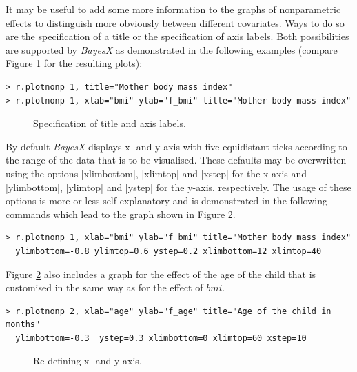 \documentclass[a4paper]{article}
\begin{document}
It may be useful to add some more information to the graphs of
nonparametric effects to distinguish more obviously between
different covariates. Ways to do so are the specification of a
title or the specification of axis labels. Both possibilities are
supported by {\it BayesX} as demonstrated in the following
examples (compare Figure \ref{bmi4} for the resulting plots):

\begin{verbatim}
> r.plotnonp 1, title="Mother body mass index"
> r.plotnonp 1, xlab="bmi" ylab="f_bmi" title="Mother body mass index"
\end{verbatim}

\begin{figure}[ht]
\begin{center}
\begin{multicols}{2}
\end{multicols}
{\it\caption{Specification of title and axis labels.\label{bmi4}}}
\end{center}
\end{figure}

By default {\it BayesX} displays x- and y-axis with five
equidistant ticks according to the range of the data that is to be
visualised. These defaults may be overwritten using the options
|xlimbottom|, |xlimtop| and |xstep| for the x-axis and
|ylimbottom|, |ylimtop| and |ystep| for the y-axis, respectively.
The usage of these options is more or less self-explanatory and is
demonstrated in the following commands which lead to the graph
shown in Figure \ref{bmi6}.

\begin{verbatim}
> r.plotnonp 1, xlab="bmi" ylab="f_bmi" title="Mother body mass index"
  ylimbottom=-0.8 ylimtop=0.6 ystep=0.2 xlimbottom=12 xlimtop=40
\end{verbatim}

Figure \ref{bmi6} also includes a graph for the effect of the age
of the child that is customised in the same way as for the effect
of $bmi$.

\begin{verbatim}
> r.plotnonp 2, xlab="age" ylab="f_age" title="Age of the child in months"
  ylimbottom=-0.3  ystep=0.3 xlimbottom=0 xlimtop=60 xstep=10
\end{verbatim}

\begin{figure}[ht]
\begin{center}
{\it\caption{Re-defining x- and y-axis.\label{bmi6}}}
\end{center}
\end{figure}
\end{document}
